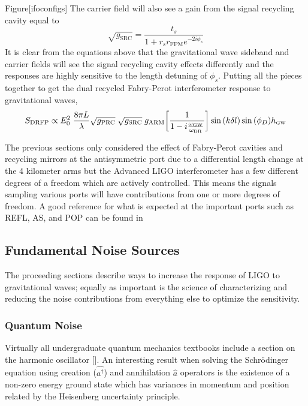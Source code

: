 		Figure[ifoconfigs]
		The carrier field will also see a gain from the signal recycling cavity equal to
		\begin{equation}
		\sqrt{g_{\text{SRC}}} = \frac{t_s}{1+ r_s r_{\text{FPM}}   e^{-2i\phi_s}}
		\end{equation}
		It is clear from the equations above that the gravitational wave sideband and carrier fields will see the signal recycling cavity effects differently and the responses are highly sensitive to the length detuning of $\phi_s$.
		Putting all the pieces together to get the dual recycled Fabry-Perot interferometer response to gravitational waves,
		\begin{equation}
		S_{\text{DRFP}} \propto E_0^2 \; \frac{8\pi L}{\lambda} \sqrt{g_{\text{PRC}}}\;\sqrt{g_{\text{SRC}}}\; g_{\text{ARM}} \bigg[\frac{1}{1 - i \frac{\omega_{\text{\tiny GW}}}{\omega_{\text{DR}}}}\bigg] \sin{(k\delta l)} \sin{(\phi_{D})} h_{\text{\tiny GW}}
		\end{equation}

		

		The previous sections only considered the effect of Fabry-Perot cavities and recycling mirrors at the antisymmetric port due to a differential length change at the 4 kilometer arms but the Advanced LIGO interferometer has a few different degrees of a freedom which are actively controlled.  This means the signals sampling various ports will have contributions from one or more degrees of freedom.  A good reference for what is expected at the important ports such  as REFL, AS, and POP can be found in \cite{kiwamu_freq1} \cite{kiwamu_freq2} \cite{kiwamu_freq3}
		\subsection{Fundamental Noise Sources}\label{funnoise}
		The proceeding sections describe ways to increase the response of LIGO to gravitational waves; equally as important is the science of characterizing and reducing the noise contributions from everything else to optimize the sensitivity.
		
		\subsubsection{Quantum Noise}\label{Sec:QuantumNoise}
		Virtually all undergraduate quantum mechanics textbooks include a section on the harmonic oscillator [\cite{Shankar}].  An interesting result when solving the Schrödinger equation using creation ($\hat{a^{\dagger}}$) and annihilation $\hat{a}$ operators is the existence of a non-zero energy ground state which has variances in momentum and position related by the Heisenberg uncertainty principle.
		
